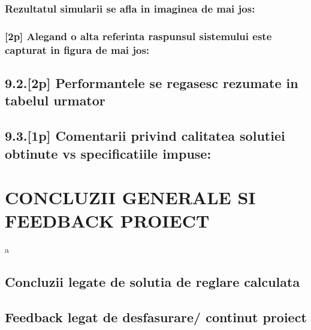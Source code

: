 \documentclass[12pt,english]{article}
\begin{document}
\subsubsection {Rezultatul simularii se afla in imaginea de mai jos: }
\subsubsection {[2p] Alegand o alta referinta raspunsul sistemului este capturat in figura de mai jos: }
\subsection {9.2.[2p] Performantele se regasesc rezumate in tabelul urmator }
\subsection {9.3.[1p] Comentarii privind calitatea solutiei obtinute vs specificatiile impuse: }

\section {CONCLUZII GENERALE SI FEEDBACK PROIECT }
a
\subsection {Concluzii legate de solutia de reglare calculata }
\subsection {Feedback legat de desfasurare/ continut proiect }
\end{document}
